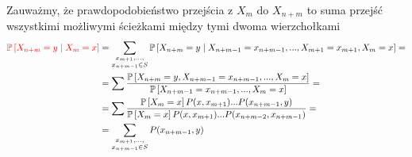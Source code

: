 \begin{solution}
\begin{enumerate}
      Zauważmy, że prawdopodobieństwo przejścia z $X_m$ do $X_{n+m}$ to suma przejść wszystkimi możliwymi ścieżkami między tymi dwoma wierzchołkami
      \begin{align*}\color{red}
        \prob{X_{n+m}=y}{X_m=x}&=\sum_{\substack{x_{m+1},..., \\ x_{n+m-1}\in S}}\prob{X_{n+m}=y}{X_{n+m-1}=x_{n+m-1},..., X_{m+1}=x_{m+1},X_m=x}=\\ 
                               &=\sum \frac{\prob{X_{n+m}=y,X_{n+m-1}=x_{n+m-1},..., X_m=x}}{\prob{X_{n+m-1}=x_{n+m-1},..., X_m=x}}=\\ 
                               &=\sum\frac{\prob{X_m=x}P(x, x_{m+1})...P(x_{n+m-1}, y)}{\prob{X_m=x}P(x, x_{m+1})...P(x_{n+m-2},x_{n+m-1})}=\\ 
                               &=\sum_{\substack{x_{m+1},...,\\ x_{n+m-1}\in S}} P(x_{n+m-1}, y)
      \end{align*}
%
%
%
%
%
%

\end{enumerate}
\end{solution}

